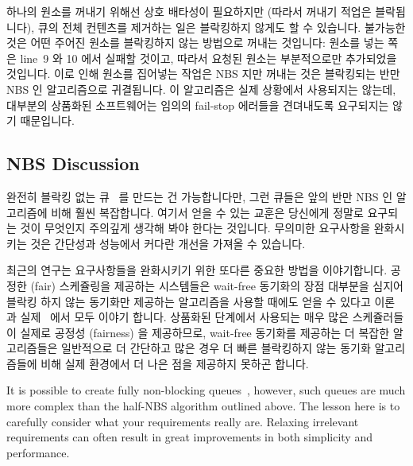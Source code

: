 하나의 원소를 꺼내기 위해선 상호 배타성이 필요하지만 (따라서 꺼내기 적업은
블락됩니다), 큐의 전체 컨텐츠를 제거하는 일은 블락킹하지 않게도 할 수 있습니다.
불가능한 것은 어떤 주어진 원소를 블락킹하지 않는 방법으로 꺼내는 것입니다:
원소를 넣는 쪽은 line~9 와 10 에서 실패할 것이고, 따라서 요청된 원소는
부분적으로만 추가되었을 것입니다.
이로 인해 원소를 집어넣는 작업은 NBS 지만 꺼내는 것은 블락킹되는 반만 NBS 인
알고리즘으로 귀결됩니다.
이 알고리즘은 실제 상황에서 사용되지는 않는데, 대부분의 상품화된 소프트웨어는
임의의 fail-stop 에러들을 견뎌내도록 요구되지는 않기 때문입니다.
\iffalse

Although mutual exclusion is required to dequeue a single element
(so that dequeue is blocking), it is possible to carry out a non-blocking
removal of the entire contents of the queue.
What is not possible is to dequeue any given element in a non-blocking
manner: The enqueuer might have failed between lines~9 and~10 of the
figure, so that the element in question is only partially enqueued.
This results in a half-NBS algorithm where enqueues are NBS but
dequeues are blocking.
This algorithm is nevertheless used in practice, in part because
most production software is not required to tolerate arbitrary fail-stop
errors.
\fi

\subsection{NBS Discussion}
\label{sec:advsync:NBS Discussion}

완전히 블락킹 없는 큐~\cite{MichaelScott96} 를 만드는 건 가능합니다만, 그런
큐들은 앞의 반만 NBS 인 알고리즘에 비해 훨씬 복잡합니다.
여기서 얻을 수 있는 교훈은 당신에게 정말로 요구되는 것이 무엇인지 주의깊게
생각해 봐야 한다는 것입니다.
무의미한 요구사항을 완화시키는 것은 간단성과 성능에서 커다란 개선을 가져올 수
있습니다.

최근의 연구는 요구사항들을 완화시키기 위한 또다른 중요한 방법을 이야기합니다.
공정한 (fair) 스케쥴링을 제공하는 시스템들은 wait-free 동기화의 장점 대부분을
심지어 블락킹 하지 않는 동기화만 제공하는 알고리즘을 사용할 때에도 얻을 수
있다고 이론~\cite{DanAlitarh2013PracticalProgress} 과
실제~\cite{SamyAlBahra2013NBS} 에서 모두 이야기 합니다.
상품화된 단계에서 사용되는 매우 많은 스케쥴러들이 실제로 공정성 (fairness) 을
제공하므로, wait-free 동기화를 제공하는 더 복잡한 알고리즘들은 일반적으로 더
간단하고 많은 경우 더 빠른 블락킹하지 않는 동기화 알고리즘들에 비해 실제
환경에서 더 나은 점을 제공하지 못하곤 합니다.
\iffalse

It is possible to create fully non-blocking queues~\cite{MichaelScott96},
however, such queues are much more complex than the half-NBS algorithm
outlined above.
The lesson here is to carefully consider what your requirements really are.
Relaxing irrelevant requirements can often result in great
improvements in both simplicity and performance.


